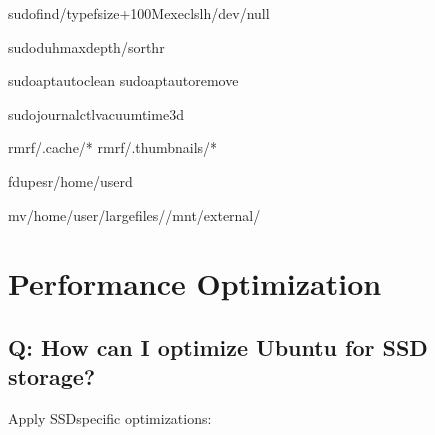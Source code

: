\documentclass[letterpaper,10pt,english]{sphinxmanual}
\begin{document}
\begin{sphinxVerbatim}[commandchars=\\\{\}]
sudofind/\PYGZhy{}typef\PYGZhy{}size+100M\PYGZhy{}execls\PYGZhy{}lh\PYGZgt{}/dev/null

sudodu\PYGZhy{}h\PYGZhy{}\PYGZhy{}max\PYGZhy{}depth/sort\PYGZhy{}hr

sudoaptautoclean
sudoaptautoremove

sudojournalctl\PYGZhy{}\PYGZhy{}vacuum\PYGZhy{}time3d

rm\PYGZhy{}rf\PYGZti{}/.cache/*
rm\PYGZhy{}rf\PYGZti{}/.thumbnails/*

fdupes\PYGZhy{}r/home/user\PYGZhy{}d

mv/home/user/large\PYGZus{}files//mnt/external/
\end{sphinxVerbatim}


\section{Performance Optimization}
\label{\detokenize{faq:performance-optimization}}

\subsection{Q: How can I optimize Ubuntu for SSD storage?}
\label{\detokenize{faq:q-how-can-i-optimize-ubuntu-for-ssd-storage}}
\sphinxAtStartPar
{} Apply SSD\sphinxhyphen{}specific optimizations:
\end{document}

